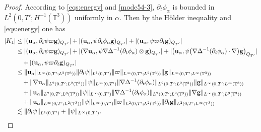 \documentclass[reqno,a4paper,11pt]{amsart}
\theoremstyle{plain}
\numberwithin{equation}{section}
\newcommand{\bg}{\mathbf{g}}
\begin{document}
\begin{proof}
					
					According to \eqref{eqs:energy} and \eqref{mode54-3}, $\partial_{t}\phi_{\alpha}$ is  bounded in $L^{2}(0,T';H^{-1}(\mathbb{T}^{3}))$  uniformly in $\alpha$.
					Then by the H\"{o}lder inequality and \eqref{eqs:energy} one has
					\begin{align}\label{K_{1}}
						\nonumber |K_{1}|&\leq|(\mathbf{u}_{\alpha}, \partial_t\psi \varpi \bg)_{Q_{T'}}|+ |(\mathbf{u}_{\alpha}, \psi\partial_t\phi_{\alpha} \bg)_{Q_{T'}}|+|(\mathbf{u}_{\alpha}, \psi\varpi\partial_t\bg)_{Q_{T'}}|
						\\&\nonumber\leq |(\mathbf{u}_{\alpha}, \partial_t\psi \varpi\bg)_{Q_{T'}}|+ |(\nabla\mathbf{u}_{\alpha}, \psi \nabla\Delta^{-1}(\partial_t\phi_{\alpha})\otimes\bg)_{Q_{T'}}|+|\big(\mathbf{u}_{\alpha}, \psi\big(\nabla\Delta^{-1}(\partial_t\phi_{\alpha})\cdot\nabla\big) \bg\big)_{Q_{T'}}|
						\\&\nonumber\quad+|(\mathbf{u}_{\alpha}, \psi\varpi\partial_t\bg)_{Q_{T'}}|
						\\&\nonumber\leq \|\mathbf{u}_{\alpha}\|_{L^{\infty}(0,T';L^{2}(\mathbb{T}^{3}))}\|\partial_t\psi\|_{L^{1}(0,T')}\|\varpi\|_{L^{\infty}(0,T';L^{2}(\mathbb{T}^{3}))}\|\bg\|_{L^{\infty}(0,T';L^{\infty}(\mathbb{T}^{3}))}
						\\&\nonumber\quad+\|\nabla\mathbf{u}_{\alpha}\|_{L^{2}(0,T';L^{2}(\mathbb{T}^{3}))}\|\psi\|_{L^{\infty}(0,T')}\|\nabla\Delta^{-1}(\partial_{t}\phi_{\alpha})\|_{L^{2}(0,T';L^{2}(\mathbb{T}^{3}))}\|\bg\|_{L^{\infty}(0,T';L^{\infty}(\mathbb{T}^{3}))}
						\\&\nonumber\quad+\|\mathbf{u}_{\alpha}\|_{L^{2}(0,T';L^{6}(\mathbb{T}^{3}))}\|\psi\|_{L^{\infty}(0,T')}\|\nabla\Delta^{-1}(\partial_{t}\phi_{\alpha})\|_{L^{2}(0,T';L^{2}(\mathbb{T}^{3}))}\|\nabla \bg\|_{L^{\infty}(0,T';L^{3}(\mathbb{T}^{3}))}
						\\&\nonumber\quad+\|\mathbf{u}_{\alpha}\|_{L^{\infty}(0,T';L^{2}(\mathbb{T}^{3}))}\|\psi\|_{L^{\infty}(0,T')}\|\varpi\|_{L^{2}(0,T';L^{2}(\mathbb{T}^{3}))}\|\partial_{t}\bg\|_{L^{2}(0,T';L^{\infty}(\mathbb{T}^{3}))}
						\\&\lesssim \|\partial_t\psi\|_{L^{1}(0,T')}+\|\psi\|_{L^{\infty}(0,T')}.
					\end{align}
					

\end{proof}
\end{document}
